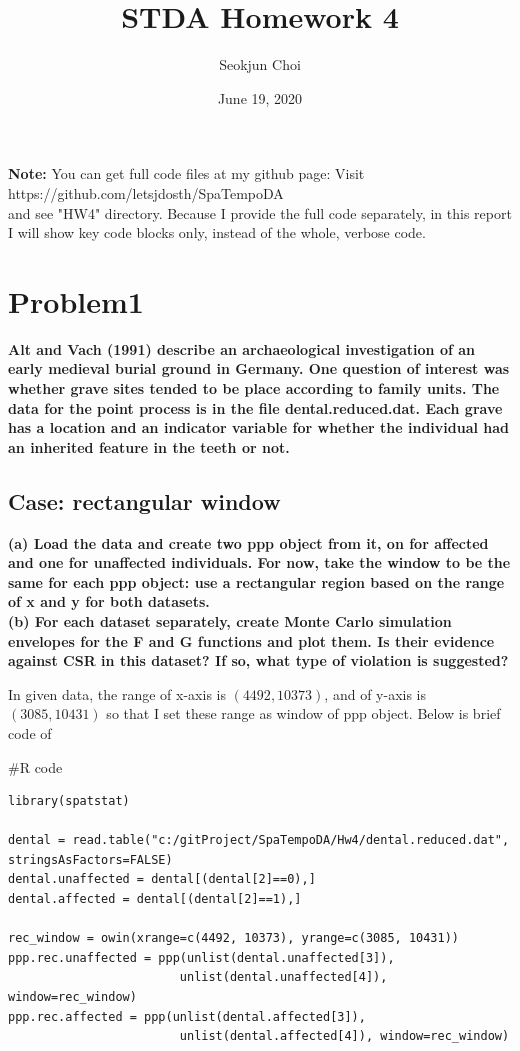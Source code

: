 \documentclass{article}
\newenvironment{Rcode}%
{%
    \begin{mdframed}
    \#R code
    \begin{small}
}
{%
    \end{small}
    \end{mdframed}
}
\begin{document}
\title{STDA Homework 4}
\author{Seokjun Choi}
\date{June 19, 2020}
\maketitle

\textbf{Note:}
You can get full code files at my github page: Visit https://github.com/letsjdosth/SpaTempoDA \\
and see "HW4" directory. Because I provide the full code separately, in this report 
I will show key code blocks only, instead of the whole, verbose code.

\section{Problem1}
\textbf{
Alt and Vach (1991) describe an archaeological investigation of an early medieval burial ground in Germany.
One question of interest was whether grave sites tended to be place according to family units.
The data for the point process is in the file dental.reduced.dat.
Each grave has a location and an indicator variable for whether the individual had an inherited feature in the teeth or not.
}
\subsection{Case: rectangular window}
\textbf{
    (a) Load the data and create two ppp object from it, on for affected and one for unaffected individuals.
    For now, take the window to be the same for each ppp object: use a rectangular region based on the range of x and y for both datasets. \\
    (b) For each dataset separately, create Monte Carlo simulation envelopes for the F and G functions and plot them.
    Is their evidence against CSR in this dataset? If so, what type of violation is suggested?
}

In given data, the range of x-axis is $(4492, 10373)$, and of y-axis is $(3085, 10431)$ so that 
I set these range as window of ppp object.
Below is brief code of 

\begin{Rcode}
    \begin{verbatim}
library(spatstat)

dental = read.table("c:/gitProject/SpaTempoDA/Hw4/dental.reduced.dat", stringsAsFactors=FALSE)
dental.unaffected = dental[(dental[2]==0),]
dental.affected = dental[(dental[2]==1),]

rec_window = owin(xrange=c(4492, 10373), yrange=c(3085, 10431))
ppp.rec.unaffected = ppp(unlist(dental.unaffected[3]), 
                        unlist(dental.unaffected[4]), window=rec_window)
ppp.rec.affected = ppp(unlist(dental.affected[3]), 
                        unlist(dental.affected[4]), window=rec_window)
    \end{verbatim}
\end{Rcode}
\end{document}
